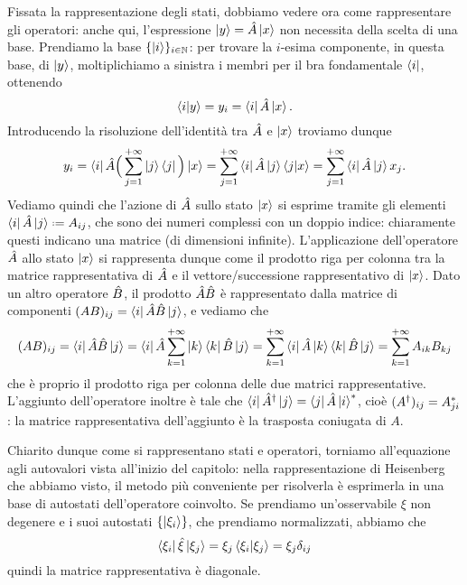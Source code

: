 Fissata la rappresentazione degli stati, dobbiamo vedere ora come rappresentare gli operatori: anche qui, l'espressione $\left|{y}\right\rangle=\hat{A}\left|{x}\right\rangle$ non necessita della scelta di una base.
Prendiamo la base $\{\left|{i}\right\rangle\}_{i\in\mathbb{N}}$: per trovare la $i$-esima componente, in questa base, di $\left|{y}\right\rangle$, moltiplichiamo a sinistra i membri per il bra fondamentale $\left\langle{i}\right|$, ottenendo
\begin{equation}
	\left\langle{i}\middle|{y}\right\rangle=y_i=\left\langle{i}\right|\hat{A}\left|{x}\right\rangle.
\end{equation}
Introducendo la risoluzione dell'identità tra $\hat{A}$ e $\left|{x}\right\rangle$ troviamo dunque
\begin{equation}
	y_i=\left\langle{i}\right|\hat{A}\Big(\sum_{{j}=1}^{+\infty}\left|{j}\right\rangle\left\langle{j}\right|\Big)\left|{x}\right\rangle=\sum_{{j}=1}^{+\infty}\left\langle{i}\right|\hat{A}\left|{j}\right\rangle\left\langle{j}\middle|{x}\right\rangle=\sum_{{j}=1}^{+\infty}\left\langle{i}\right|\hat{A}\left|{j}\right\rangle x_j.
	\label{eq:rappresentazione-operatore-matrice}
\end{equation}
Vediamo quindi che l'azione di $\hat{A}$ sullo stato $\left|{x}\right\rangle$ si esprime tramite gli elementi $\bra{i}\op A\ket{j}\defeq A_{ij}$, che sono dei numeri complessi con un doppio indice: chiaramente questi indicano una matrice (di dimensioni infinite). 
L'applicazione dell'operatore $\hat{A}$ allo stato $\left|{x}\right\rangle$ si rappresenta dunque come il prodotto riga per colonna tra la matrice rappresentativa di $\hat{A}$ e il vettore/successione rappresentativo di $\left|{x}\right\rangle$.
Dato un altro operatore $\hat{B}$, il prodotto $\hat{A}\hat{B}$ è rappresentato dalla matrice di componenti $(AB)_{ij}=\left\langle{i}\right|\hat{A}\hat{B}\left|{j}\right\rangle$, e vediamo che
\begin{equation}
	(AB)_{ij}=\left\langle{i}\right|\hat{A}\hat{B}\left|{j}\right\rangle=\left\langle{i}\right|\hat{A}\sum_{{k}=1}^{+\infty}\left|{k}\right\rangle\left\langle{k}\right|\hat{B}\left|{j}\right\rangle=\sum_{{k}=1}^{+\infty}\left\langle{i}\right|\hat{A}\left|{k}\right\rangle\left\langle{k}\right|\hat{B}\left|{j}\right\rangle=\sum_{{k}=1}^{+\infty}A_{ik}B_{kj}
	\label{eq:prodotto-operatori-matrici}
\end{equation}
che è proprio il prodotto riga per colonna delle due matrici rappresentative.
L'aggiunto dell'operatore inoltre è tale che $\left\langle{i}\right|{\hat{A}}^\dagger\left|{j}\right\rangle=\left\langle{j}\right|\hat{A}\left|{i}\right\rangle^*$, cioè $({A}^\dagger)_{ij}=A_{ji}^*$: la matrice rappresentativa dell'aggiunto è la trasposta coniugata di $A$.

Chiarito dunque come si rappresentano stati e operatori, torniamo all'equazione agli autovalori vista all'inizio del capitolo: nella rappresentazione di Heisenberg che abbiamo visto, il metodo più conveniente per risolverla è esprimerla in una base di autostati dell'operatore coinvolto.
Se prendiamo un'osservabile $\xi$ non degenere e i suoi autostati $\{\left|{\xi_i}\right\rangle\}$, che prendiamo normalizzati, abbiamo che
\begin{equation}
	\left\langle{\xi_i}\right|\hat{\xi}\left|{\xi_j}\right\rangle=\xi_j\left\langle{\xi_i}\middle|{\xi_j}\right\rangle=\xi_j\delta_{ij}
\end{equation}
quindi la matrice rappresentativa è diagonale.

